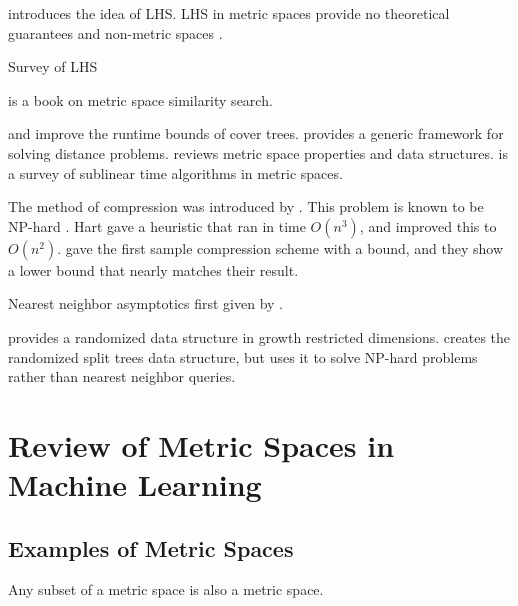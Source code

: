 \documentclass[../main.tex]{subfiles}
\begin{document}
\cite{gionis1999similarity} introduces the idea of LHS.
LHS in metric spaces \cite{tellez2010locality,novak2010locality} provide no theoretical guarantees and non-metric spaces \cite{mu2010non}.

Survey of LHS \cite{wang2014hashing} \cite{wang2016learning}

\cite{zezula2006similarity} is a book on metric space similarity search.

\cite{ram2009linear} and \cite{curtin2015plug} improve the runtime bounds of cover trees.
\cite{curtin2013tree} provides a generic framework for solving distance problems.
\cite{clarkson2006nearest} reviews metric space properties and data structures.
\cite{czumaj2010sublinear} is a survey of sublinear time algorithms in metric spaces.

The method of compression was introduced by \citet{hart1968condensed}.
This problem is known to be NP-hard \citep{zukhba2010np}.
Hart gave a heuristic that ran in time $O(n^3)$,
and\cite{angiulli2005fast} improved this to $O(n^2)$.
\cite{gottlieb2014near} gave the first sample compression scheme with a bound,
and they show a lower bound that nearly matches their result.

Nearest neighbor asymptotics first given by \citet{cover1967nearest}.

\cite{hildrum2004note} provides a randomized data structure in growth restricted dimensions.
\cite{talwar2004bypassing} creates the randomized split trees data structure,
but uses it to solve NP-hard problems rather than nearest neighbor queries.


\section{Review of Metric Spaces in Machine Learning}


\subsection{Examples of Metric Spaces}

\begin{example}
    Any subset of a metric space is also a metric space.
\end{example}

\end{document}
